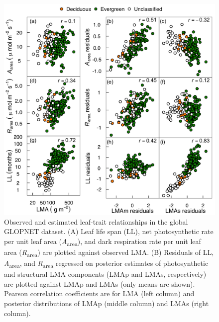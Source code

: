 \documentclass[
  12pt,
]{article}
\providecommand{\DIFdelend}{} %
\providecommand{\DIFaddbeginFL}{} %
\providecommand{\DIFaddendFL}{} %
\providecommand{\DIFdelbeginFL}{} %
\providecommand{\DIFdelendFL}{} %
\newcommand{\DIFscaledelfig}{0.5}
\newlength{\DIFdelgraphicswidth} %
\newlength{\DIFdelgraphicsheight} %
\newcommand{\DIFaddincludegraphics}[2][]{{\color{blue}\fbox{\DIFOincludegraphics[#1]{#2}}}} %
\newcommand{\DIFdelincludegraphics}[2][]{%
\sbox{\DIFdelgraphicsbox}{\DIFOincludegraphics[#1]{#2}}%
\settoboxwidth{\DIFdelgraphicswidth}{\DIFdelgraphicsbox} %
\settoboxtotalheight{\DIFdelgraphicsheight}{\DIFdelgraphicsbox} %
\scalebox{\DIFscaledelfig}{%
\parbox[b]{\DIFdelgraphicswidth}{\usebox{\DIFdelgraphicsbox}\\[-\baselineskip] \rule{\DIFdelgraphicswidth}{0em}}\llap{\resizebox{\DIFdelgraphicswidth}{\DIFdelgraphicsheight}{%
\setlength{\unitlength}{\DIFdelgraphicswidth}%
\begin{picture}(1,1)%
\thicklines\linethickness{2pt} %
{\color[rgb]{1,0,0}\put(0,0){\framebox(1,1){}}}%
{\color[rgb]{1,0,0}\put(0,0){\line( 1,1){1}}}%
{\color[rgb]{1,0,0}\put(0,1){\line(1,-1){1}}}%
\end{picture}%
}\hspace*{3pt}}} %
} %
\DeclareRobustCommand{\DIFdelend}{\DIFOaddend \let\includegraphics\DIFOincludegraphics} %
\DeclareRobustCommand{\DIFaddbeginFL}{\DIFOaddbeginFL \let\includegraphics\DIFaddincludegraphics} %
\DeclareRobustCommand{\DIFaddendFL}{\DIFOaddendFL \let\includegraphics\DIFOincludegraphics} %
\DeclareRobustCommand{\DIFdelbeginFL}{\DIFOdelbeginFL \let\includegraphics\DIFdelincludegraphics} %
\DeclareRobustCommand{\DIFdelendFL}{\DIFOaddendFL \let\includegraphics\DIFOincludegraphics} %
\begin{document}
\DIFdelend \begin{figure}
\DIFdelbeginFL %
\DIFdelendFL \DIFaddbeginFL \hypertarget{fig:GLplt}{%
\centering
\includegraphics{../figs/GL_3.png}
\caption{Observed and estimated leaf-trait relationships in the global GLOPNET dataset.
(A) Leaf life span (LL), net photosynthetic rate per unit leaf area (\emph{A}\textsubscript{area}), and dark respiration rate per unit leaf area (\emph{R}\textsubscript{area}) are plotted against observed LMA.
(B) Residuals of LL, \emph{A}\textsubscript{area}, and \emph{R}\textsubscript{area} regressed on posterior estimates of photosynthetic and structural LMA components (LMAp and LMAs, respectively) are plotted against LMAp and LMAs (only means are shown).
Pearson correlation coefficients are for LMA (left column) and posterior distributions of LMAp (middle column) and LMAs (right column).}\label{fig:GLplt}
}
\DIFaddendFL \end{figure}
\end{document}
